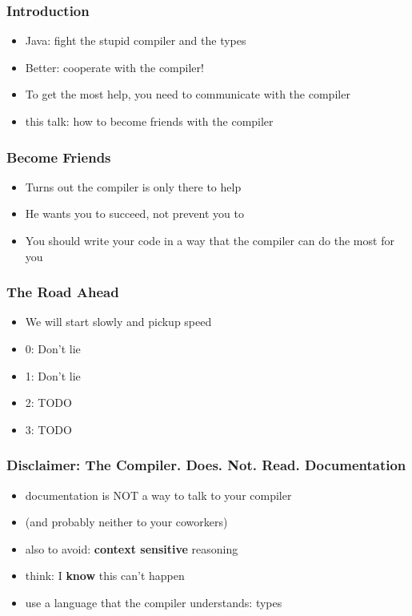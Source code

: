 \documentclass{beamer}
\begin{document}
\begin{frame}
  \frametitle{Introduction}
  \begin{itemize}
  \item Java: fight the stupid compiler and the types
  \item Better: cooperate with the compiler!
  \item To get the most help, you need to communicate with
    the compiler
  \item this talk: how to become friends with the compiler
  \end{itemize}
\end{frame}

\begin{frame}
  \frametitle{Become Friends}
  \begin{itemize}
  \item Turns out the compiler is only there to help
  \item He wants you to succeed, not prevent you to
  \item You should write your code in a way that the compiler can do
    the most for you
  \end{itemize}
\end{frame}

\begin{frame}
  \frametitle{The Road Ahead}
  \begin{itemize}
  \item We will start slowly and pickup speed
  \item 0: Don't lie
  \item 1: Don't lie
  \item 2: TODO
  \item 3: TODO
  \end{itemize}
\end{frame}

\begin{frame}
  \frametitle{Disclaimer: The Compiler. Does. Not. Read. Documentation}
  \begin{itemize}
  \item documentation is NOT a way to talk to your compiler
  \item (and probably neither to your coworkers)
  \item also to avoid: \textbf{context sensitive} reasoning
  \item think: I \textbf{know} this can't happen
  \item use a language that the compiler understands: types
  \end{itemize}
\end{frame}
\end{document}
